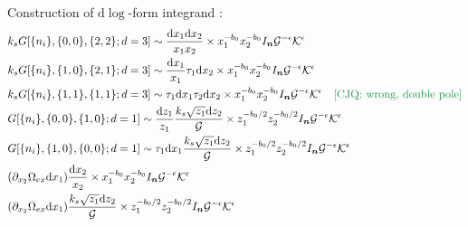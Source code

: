 \documentclass[a4paper,12pt]{article}
\newcommand{\n}{\nonumber}
\def\di{{\mathrm{d}}}
\def\ep{\epsilon}
\newcommand{\mG}{\mathcal{G}}
\newcommand{\mK}{\mathcal{K}}
\newcommand{\cjq}[1]{{\color[rgb]{.1,.6,.3}{[{CJQ:} #1]}}}
\begin{document}
Construction of $\di \log$-form integrand :
\begin{align}
&k_s G[\{n_i\},\{0,0\},\{2,2\};d=3]\sim 
\frac{\di x_1 \di x_2}{x_1 x_2} \times x_1^{-b_0} x_2^{-b_0}  I_{\bm{n}} \mG^{-\ep} \mK^\ep \\
&k_s G[\{n_i\},\{1,0\},\{2,1\};d=3]\sim 
\frac{\di x_1}{x_1 } \tau_1 \di x_2 \times x_1^{-b_0} x_2^{-b_0}  I_{\bm{n}} \mG^{-\ep}\mK^\ep \\
& k_s G[\{n_i\},\{1,1\},\{1,1\};d=3]\sim 
\tau_1 \di x_1 \tau_2 \di x_2 \times x_1^{-b_0} x_2^{-b_0}  I_{\bm{n}} \mG^{-\ep}\mK^\ep ~~~ \text{\cjq{wrong, double pole}} \n\\
&G[\{n_i\},\{0,0\},\{1,0\};d=1]
\sim \frac{\di z_1}{z_1 }\frac{ k_s\sqrt{z_1} \di z_2}{ \mG } \times z_1^{-b_0/2} z_2^{-b_0/2} I_{\bm{n}} \mG^{-\ep} \mK^\ep  \\
&G[\{n_i\},\{1,0\},\{0,0\};d=1]
\sim \tau_1 \di x_1 \frac{ k_s\sqrt{z_1} \di z_2}{ \mG } \times z_1^{-b_0/2} z_2^{-b_0/2} I_{\bm{n}} \mG^{-\ep} \mK^\ep  \\
&(\partial_{x_2} \Omega_{ex} \di x_1)\frac{\di x_2}{x_2} \times x_1^{-b_0} x_2^{-b_0} I_{\bm{n}} \mG^{-\ep} \mK^{\ep} \\
&(\partial_{x_2} \Omega_{ex} \di x_1) \frac{ k_s\sqrt{z_1} \di z_2}{ \mG } \times z_1^{-b_0/2} z_2^{-b_0/2} I_{\bm{n}} \mG^{-\ep} \mK^\ep
\end{align}
\end{document}
